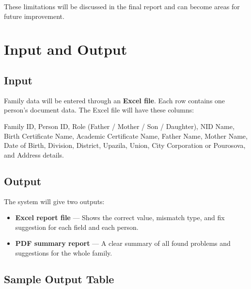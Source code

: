 \documentclass[12pt, a4paper]{article}
\begin{document}
These limitations will be discussed in the final report and can become
areas for future improvement.

\section{Input and Output}

\subsection{Input}

Family data will be entered through an \textbf{Excel file}. Each row contains
one person's document data. The Excel file will have these columns:

\vspace{0.2cm}
Family ID, Person ID, Role (Father / Mother / Son / Daughter), NID Name,
Birth Certificate Name, Academic Certificate Name, Father Name, Mother Name,
Date of Birth, Division, District, Upazila, Union, City Corporation or
Pourosova, and Address details.

\subsection{Output}

The system will give two outputs:

\begin{itemize}
    \item \textbf{Excel report file} --- Shows the correct value, mismatch
          type, and fix suggestion for each field and each person.
    \item \textbf{PDF summary report} --- A clear summary of all found
          problems and suggestions for the whole family.
\end{itemize}

\subsection{Sample Output Table}
\end{document}
